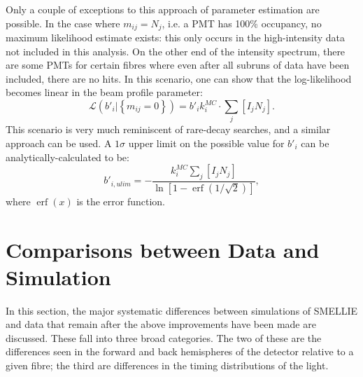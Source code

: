 Only a couple of exceptions to this approach of parameter estimation are possible. In the case where $m_{ij} = N_{j}$, i.e. a PMT has 100\% occupancy, no maximum likelihood estimate exists: this only occurs in the high-intensity data not included in this analysis. On the other end of the intensity spectrum, there are some PMTs for certain fibres where even after all subruns of data have been included, there are no hits. In this scenario, one can show that the log-likelihood becomes linear in the beam profile parameter:
\begin{equation}
    \mathcal{L}\left(b'_{i}|\left\{m_{ij}=0\right\}\right) = b'_{i}k_{i}^{MC}\cdot\sum_{j}\left[I_{j}N_{j}\right].
\end{equation}
This scenario is very much reminiscent of rare-decay searches, and a similar approach can be used. A $1 \sigma$ upper limit on the possible value for $b'_{i}$ can be analytically-calculated to be:
\begin{equation}
    b'_{i,ulim} = -\frac{k_{i}^{MC}\sum_{j}\left[I_{j}N_{j}\right]}{\ln\left[1 - \operatorname{erf}\left(1/\sqrt{2}\right)\right]},
\end{equation}
where $\operatorname{erf}(x)$ is the error function.

\section{Comparisons between Data and Simulation}\label{sec:smellie_systematics}
In this section, the major systematic differences between simulations of SMELLIE and data that remain after the above improvements have been made are discussed. These fall into three broad categories. The two of these are the differences seen in the forward and back hemispheres of the detector relative to a given fibre; the third are differences in the timing distributions of the light.

